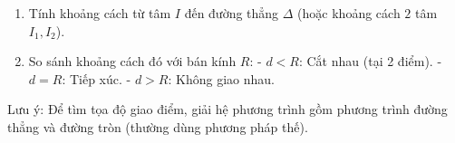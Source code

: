 \begin{enumerate}
\item Tính khoảng cách từ tâm $I$ đến đường thẳng $\Delta$ (hoặc khoảng cách $2$ tâm $I_1, I_2$).
\item So sánh khoảng cách đó với bán kính $R$:
  - $d < R$: Cắt nhau (tại 2 điểm).
  - $d = R$: Tiếp xúc.
  - $d > R$: Không giao nhau.
\end{enumerate}
Lưu ý: Để tìm tọa độ giao điểm, giải hệ phương trình gồm phương trình đường thẳng và đường tròn (thường dùng phương pháp thế).

